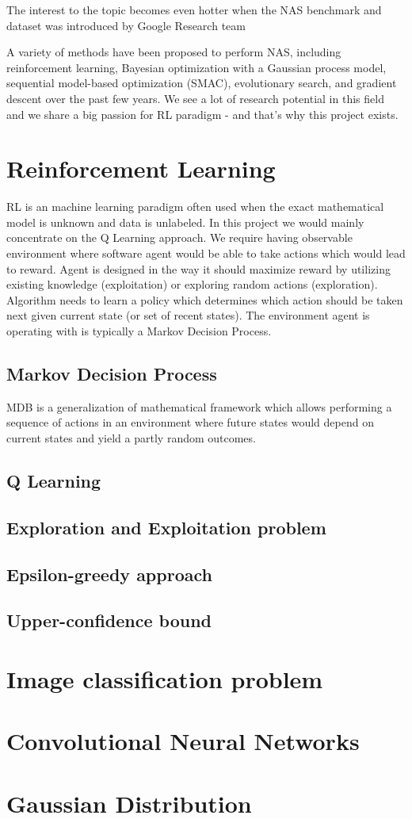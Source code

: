 The interest to the topic becomes even hotter when the NAS benchmark and dataset was introduced by Google Research team \cite{pmlr-v97-ying19a}

A variety of methods have been proposed to perform NAS, including reinforcement learning, Bayesian optimization with a Gaussian process model, sequential model-based optimization (SMAC), evolutionary search, and gradient descent over the past few years. We see a lot of research potential in this field and we share a big passion for RL paradigm - and that's why this project exists.

\section{Reinforcement Learning}

RL is an machine learning paradigm often used when the exact mathematical model is unknown and data is unlabeled. In this project we would mainly concentrate on the Q Learning approach. We require having observable environment where software agent would be able to take actions which would lead to reward. Agent is designed in the way it should maximize reward by utilizing existing knowledge (exploitation) or exploring random actions (exploration). Algorithm needs to learn a policy which determines which action should be taken next given current state (or set of recent states). The environment agent is operating with is typically a Markov Decision Process.

\subsection{Markov Decision Process}

MDB is a generalization of mathematical framework which allows performing a sequence of actions in an environment where future states would depend on current states and yield a partly random outcomes.

\subsection{Q Learning}
\subsection{Exploration and Exploitation problem}
\subsection{Epsilon-greedy approach}
\subsection{Upper-confidence bound}
\section{Image classification problem}
\section{Convolutional Neural Networks}
\section{Gaussian Distribution}



